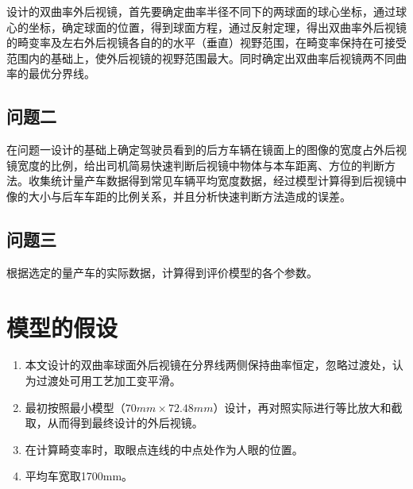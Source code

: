 \documentclass[withoutpreface,bwprint]{cumcmthesis} %
\begin{document}
\par 设计的双曲率外后视镜，首先要确定曲率半径不同下的两球面的球心坐标，通过球心的坐标，确定球面的位置，得到球面方程，通过反射定理，得出双曲率外后视镜的畸变率及左右外后视镜各自的的水平（垂直）视野范围，在畸变率保持在可接受范围内的基础上，使外后视镜的视野范围最大。同时确定出双曲率后视镜两不同曲率的最优分界线。
\subsection{问题二}

\par 在问题一设计的基础上确定驾驶员看到的后方车辆在镜面上的图像的宽度占外后视镜宽度的比例，给出司机简易快速判断后视镜中物体与本车距离、方位的判断方法。收集统计量产车数据得到常见车辆平均宽度数据，经过模型计算得到后视镜中像的大小与后车车距的比例关系，并且分析快速判断方法造成的误差。
\subsection{问题三}

\par 根据选定的量产车的实际数据，计算得到评价模型的各个参数。 

\section{模型的假设}

\begin{enumerate}
	\item 本文设计的双曲率球面外后视镜在分界线两侧保持曲率恒定，忽略过渡处，认为过渡处可用工艺加工变平滑。
	\item 最初按照最小模型（$70mm \times 72.48mm$）设计，再对照实际进行等比放大和截取，从而得到最终设计的外后视镜。
	\item 在计算畸变率时，取眼点连线的中点处作为人眼的位置。
	\item 平均车宽取1700mm。  
\end{enumerate}
\end{document}
